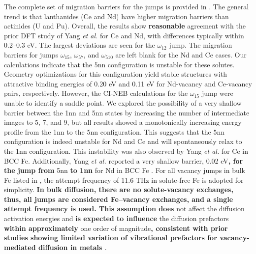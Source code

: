 \documentclass[preprint,12pt]{elsarticle}
\providecommand{\DIFaddtex}[1]{{\bf #1}} %
\providecommand{\DIFdeltex}[1]{} %
\providecommand{\DIFaddbegin}{\protect\color{blue}} %
\providecommand{\DIFaddend}{\protect\color{black}} %
\providecommand{\DIFdelbegin}{\protect\color{red}} %
\providecommand{\DIFdelend}{\protect\color{black}} %
\providecommand{\DIFadd}[1]{\texorpdfstring{\DIFaddtex{#1}}{#1}} %
\providecommand{\DIFdel}[1]{\texorpdfstring{\DIFdeltex{#1}}{}} %
\newcommand{\DIFscaledelfig}{0.5}
\newlength{\DIFdelgraphicswidth} %
\newlength{\DIFdelgraphicsheight} %
\newcommand{\DIFaddincludegraphics}[2][]{{\color{blue}\fbox{\DIFOincludegraphics[#1]{#2}}}} %
\newcommand{\DIFdelincludegraphics}[2][]{%
\sbox{\DIFdelgraphicsbox}{\DIFOincludegraphics[#1]{#2}}%
\settoboxwidth{\DIFdelgraphicswidth}{\DIFdelgraphicsbox} %
\settoboxtotalheight{\DIFdelgraphicsheight}{\DIFdelgraphicsbox} %
\scalebox{\DIFscaledelfig}{%
\parbox[b]{\DIFdelgraphicswidth}{\usebox{\DIFdelgraphicsbox}\\[-\baselineskip] \rule{\DIFdelgraphicswidth}{0em}}\llap{\resizebox{\DIFdelgraphicswidth}{\DIFdelgraphicsheight}{%
\setlength{\unitlength}{\DIFdelgraphicswidth}%
\begin{picture}(1,1)%
\thicklines\linethickness{2pt} %
{\color[rgb]{1,0,0}\put(0,0){\framebox(1,1){}}}%
{\color[rgb]{1,0,0}\put(0,0){\line( 1,1){1}}}%
{\color[rgb]{1,0,0}\put(0,1){\line(1,-1){1}}}%
\end{picture}%
}\hspace*{3pt}}} %
} %
\DeclareRobustCommand{\DIFaddbegin}{\DIFOaddbegin \let\includegraphics\DIFaddincludegraphics} %
\DeclareRobustCommand{\DIFaddend}{\DIFOaddend \let\includegraphics\DIFOincludegraphics} %
\DeclareRobustCommand{\DIFdelbegin}{\DIFOdelbegin \let\includegraphics\DIFdelincludegraphics} %
\DeclareRobustCommand{\DIFdelend}{\DIFOaddend \let\includegraphics\DIFOincludegraphics} %
\begin{document}
The complete set of migration barriers for the jumps is provided in . The general trend is that lanthanides (Ce and Nd) have higher migration barriers than actinides (U and Pu). Overall, the results show \DIFdelbegin \DIFdel{good }\DIFdelend \DIFaddbegin \DIFadd{reasonable }\DIFaddend agreement with the prior DFT study of Yang \textit{et al.} \cite{yang_significant_2023} for Ce and Nd, with differences typically within 0.2–0.3 eV. The largest deviations are seen for the $\omega_{12}$ jump. The migration barriers for jumps $\omega_{15}$, $\omega_{57}$, and $\omega_{510}$ are left blank for the Nd and Ce cases. Our calculations indicate that the 5nn configuration is unstable for these solutes. Geometry optimizations for this configuration yield stable structures with attractive binding energies of 0.20 eV and 0.11 eV for Nd-vacancy and Ce-vacancy pairs, respectively. However, the CI-NEB calculations for the $\omega_{15}$ jump were unable to identify a saddle point. We explored the possibility of a very shallow barrier between the 1nn and 5nn states by increasing the number of intermediate images to 5, 7, and 9, but all results showed a monotonically increasing energy profile from the 1nn to the 5nn configuration. This suggests that the 5nn configuration is indeed unstable for Nd and Ce and will spontaneously relax to the 1nn configuration. This instability was also observed by Yang \textit{et al.} \cite{yang_significant_2023} for Ce in BCC Fe. Additionally, Yang \textit{et al.} reported a very shallow barrier, 0.02 eV\DIFdelbegin \DIFdel{above the }\DIFdelend \DIFaddbegin \DIFadd{, for the jump from }\DIFaddend 5nn \DIFdelbegin \DIFdel{configuration, }\DIFdelend \DIFaddbegin \DIFadd{to 1nn }\DIFaddend for Nd in BCC Fe \cite{yang_significant_2023}.
For all vacancy jumps in bulk Fe listed in , the attempt frequency of 11.6 THz \cite{messina_systematic_2016} in solute-free Fe is adopted for simplicity. \DIFdelbegin \DIFdel{This assumption will }\DIFdelend \DIFaddbegin \DIFadd{In bulk diffusion, there are no solute-vacancy exchanges, thus, all jumps are considered Fe–vacancy exchanges, and a single attempt frequency is used. This assumption does }\DIFaddend not affect the diffusion activation energies and \DIFdelbegin \DIFdel{will only affect }\DIFdelend \DIFaddbegin \DIFadd{is expected to influence }\DIFaddend the diffusion prefactors \DIFdelbegin \DIFdel{by less than }\DIFdelend \DIFaddbegin \DIFadd{within approximately }\DIFaddend one order of magnitude\DIFaddbegin \DIFadd{, consistent with prior studies showing limited variation of vibrational prefactors for vacancy-mediated diffusion in metals \cite{yang_significant_2023}}\DIFaddend .
\end{document}

